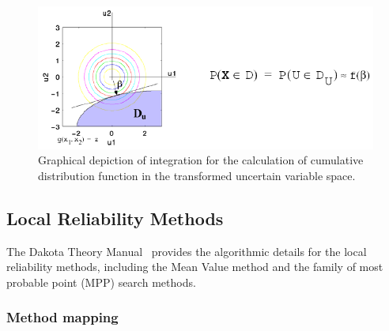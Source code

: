 \begin{figure}
  \centering
  \includegraphics[scale=0.75]{images/cdf_tran_graphic}
  \caption{Graphical depiction of integration for the calculation of
    cumulative distribution function in the transformed uncertain
    variable space.}
  \label{uq:figure06}
\end{figure}

\subsection{Local Reliability Methods}\label{uq:reliability:local}

The Dakota Theory Manual~\cite{TheoMan} provides the algorithmic
details for the local reliability methods, including the Mean Value
method and the family of most probable point (MPP) search methods.


\subsubsection{Method mapping} \label{uq:reliability:local:map}

